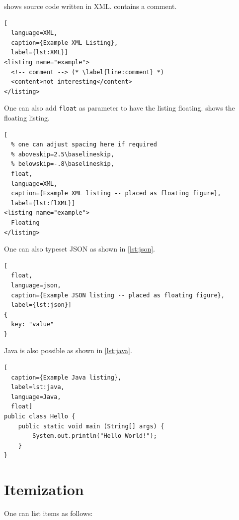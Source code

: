 \begin{ltgexample}
 shows source code written in XML.
 contains a comment.

\begin{lstlisting}[
  language=XML,
  caption={Example XML Listing},
  label={lst:XML}]
<listing name="example">
  <!-- comment --> (* \label{line:comment} *)
  <content>not interesting</content>
</listing>
\end{lstlisting}
\end{ltgexample}

One can also add \verb+float+ as parameter to have the listing floating.
 shows the floating listing.

\begin{ltgexample}
\begin{lstlisting}[
  % one can adjust spacing here if required
  % aboveskip=2.5\baselineskip,
  % belowskip=-.8\baselineskip,
  float,
  language=XML,
  caption={Example XML listing -- placed as floating figure},
  label={lst:flXML}]
<listing name="example">
  Floating
</listing>
\end{lstlisting}
\end{ltgexample}

One can also typeset JSON as shown in \cref{lst:json}.

\begin{ltgexample}
\begin{lstlisting}[
  float,
  language=json,
  caption={Example JSON listing -- placed as floating figure},
  label={lst:json}]
{
  key: "value"
}
\end{lstlisting}
\end{ltgexample}

Java is also possible as shown in \cref{lst:java}.

\begin{ltgexample}
\begin{lstlisting}[
  caption={Example Java listing},
  label=lst:java,
  language=Java,
  float]
public class Hello {
    public static void main (String[] args) {
        System.out.println("Hello World!");
    }
}
\end{lstlisting}
\end{ltgexample}

\section{Itemization}

One can list items as follows:

